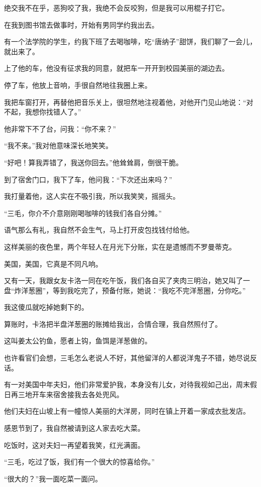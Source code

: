 \par 绝交我不在乎，恶狗咬了我，我绝不会反咬狗，但是我可以用棍子打它。
\par 在我到图书馆去做事时，开始有男同学约我出去。
\par 有一个法学院的学生，约我下班了去喝咖啡，吃“唐纳子”甜饼，我们聊了一会儿，就出来了。
\par 上了他的车，他没有征求我的同意，就把车一开开到校园美丽的湖边去。
\par 停了车，他放上音响，手很自然地往我圈上来。
\par 我把车窗打开，再替他把音乐关上，很坦然地注视着他，对他开门见山地说：“对不起，我想你找错人了。”
\par 他非常下不了台，问我：“你不来？”
\par “我不来。”我对他意味深长地笑笑。
\par “好吧！算我弄错了，我送你回去。”他耸耸肩，倒很干脆。
\par 到了宿舍门口，我下了车，他问我：“下次还出来吗？”
\par 我打量着他，这人实在不吸引我，所以我笑笑，摇摇头。
\par “三毛，你介不介意刚刚喝咖啡的钱我们各自分摊。”
\par 语气那么有礼，我自然不会生气，马上打开皮包找钱付给他。
\par 这样美丽的夜色里，两个年轻人在月光下分账，实在是遗憾而不罗曼蒂克。
\par 美国，美国，它真是不同凡响。
\par 又有一天，我跟女友卡洛一同在吃午饭，我们各自买了夹肉三明治，她又叫了一盘“炸洋葱圈”，等到我吃完了，预备付账，她说：“我吃不完洋葱圈，分你吃。”
\par 我这傻瓜就吃掉她剩下的。
\par 算账时，卡洛把半盘洋葱圈的账摊给我出，合情合理，我自然照付了。
\par 这叫姜太公钓鱼，愿者上钩，鱼饵是洋葱做的。
\par 也许看官们会想，三毛怎么老说人不好，其他留洋的人都说洋鬼子不错，她尽说反话。
\par 有一对美国中年夫妇，他们非常爱护我，本身没有儿女，对待我视如己出，周末假日再三地开车来宿舍接我去各处兜风。
\par 他们夫妇在山坡上有一幢惊人美丽的大洋房，同时在镇上开着一家成衣批发店。
\par 感恩节到了，我自然被请到这人家去吃大菜。
\par 吃饭时，这对夫妇一再望着我笑，红光满面。
\par “三毛，吃过了饭，我们有一个很大的惊喜给你。”
\par “很大的？”我一面吃菜一面问。
